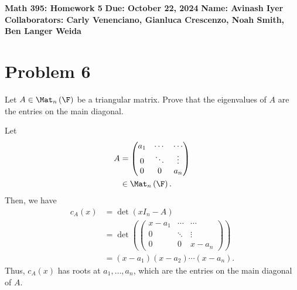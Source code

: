 \documentclass[10pt]{mypackage}
\begin{document}
\RaggedRight
\begin{center}
  \textbf{Math 395: Homework 5}\break
  \textbf{Due: October 22, 2024}\break
  \textbf{Name: Avinash Iyer}\break
  \textbf{Collaborators: Carly Venenciano, Gianluca Crescenzo, Noah Smith, Ben Langer Weida}
\end{center}
\section{Problem 6}%
\begin{problem}
  Let $A\in \Mat_{n}\left(\F\right)$ be a triangular matrix. Prove that the eigenvalues of $A$ are the entries on the main diagonal.
\end{problem}
\begin{solution}
  Let
  \begin{align*}
    A &=  \begin{pmatrix}
a_1 & \cdots & \cdots \\
0 & \ddots & \vdots \\
0 & 0 & a_n 
\end{pmatrix}\\
      &\in \Mat_{n}\left(\F\right).
  \end{align*}
  Then, we have
  \begin{align*}
    c_A(x) &= \det\left(xI_{n} - A\right)\\
           &= \det\left(\begin{pmatrix}
x - a_1 & \cdots & \cdots \\
0 & \ddots & \vdots \\
0 & 0 & x - a_n 
\end{pmatrix}\right)\\
                                &= \left(x-a_1\right)\left(x-a_2\right)\cdots\left(x-a_n\right).
  \end{align*}
  Thus, $c_A(x)$ has roots at $a_1,\dots,a_n$, which are the entries on the main diagonal of $A$.
\end{solution}
\end{document}

